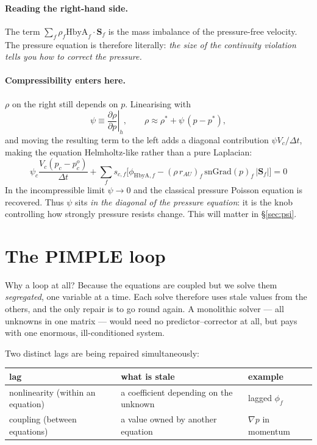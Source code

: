 \documentclass[11pt,a4paper]{article}
\newcommand{\Sf}{\mathbf{S}_f}
\newcommand{\dt}{\Delta t}
\begin{document}
\paragraph{Reading the right-hand side.} The term
$\sum_f \rho_f \mathrm{HbyA}_f\!\cdot\!\Sf$ is the mass imbalance of the
pressure-free velocity. The pressure equation is therefore literally: \emph{the
size of the continuity violation tells you how to correct the pressure.}

\paragraph{Compressibility enters here.} $\rho$ on the right still depends on
$p$. Linearising with
\begin{equation}
  \psi \equiv \left.\frac{\partial \rho}{\partial p}\right|_{h},
  \qquad
  \rho \approx \rho^{*} + \psi\,(p - p^{*}),
\end{equation}
and moving the resulting term to the left adds a diagonal contribution
$\psi V_c/\dt$, making the equation Helmholtz-like rather than a pure Laplacian:
\begin{equation}
  \boxed{\;
  \psi_c \frac{V_c (p_c - p_c^{o})}{\dt}
  + \sum_f s_{c,f}\Big[\phi_{\mathrm{HbyA},f}
      - (\rho\, r_{AU})_f \,\mathrm{snGrad}(p)_f\,|\Sf|\Big] = 0 \;}
  \label{eq:peqn}
\end{equation}
In the incompressible limit $\psi \to 0$ and the classical pressure Poisson
equation is recovered. Thus $\psi$ sits \emph{in the diagonal of the pressure
equation}: it is the knob controlling how strongly pressure resists change.
This will matter in \S\ref{sec:psi}.

\section{The PIMPLE loop}\label{sec:pimple}

Why a loop at all? Because the equations are coupled but we solve them
\emph{segregated}, one variable at a time. Each solve therefore uses stale
values from the others, and the only repair is to go round again. A monolithic
solver --- all unknowns in one matrix --- would need no predictor--corrector at
all, but pays with one enormous, ill-conditioned system.

Two distinct lags are being repaired simultaneously:

\begin{center}
\begin{tabular}{@{}lll@{}}
\toprule
\textbf{lag} & \textbf{what is stale} & \textbf{example} \\
\midrule
nonlinearity (within an equation) & a coefficient depending on the unknown & lagged $\phi_f$ \\
coupling (between equations) & a value owned by another equation & $\nabla p$ in momentum \\
\bottomrule
\end{tabular}
\end{center}
\end{document}
